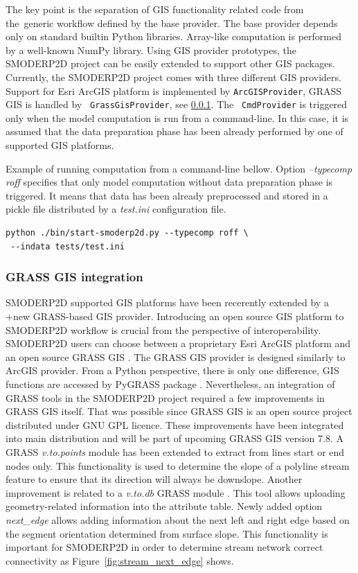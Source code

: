The key point is the separation of GIS functionality related code from
the~generic workflow defined by the base provider. The base provider
depends only on standard builtin Python libraries. Array-like
computation is performed by a well-known NumPy library. Using GIS
provider prototypes, the SMODERP2D project can be easily extended to
support other GIS packages. Currently, the SMODERP2D project comes
with three different GIS providers. Support for Esri ArcGIS platform
is implemented by {\tt ArcGISProvider}, GRASS GIS is handled by {\tt
  GrassGisProvider}, see \ref{sec:grass_provider}. The {\tt
  CmdProvider} is triggered only when the model computation is run
from a command-line. In this case, it is assumed that the data
preparation phase has been already performed by one of supported GIS
platforms.

Example of running computation from a command-line bellow. Option {\it
  --typecomp roff} specifies that only model computation without data
preparation phase is triggered. It means that data has been already
preprocessed and stored in a pickle file distributed by a {\it test.ini}
configuration file.

\begin{verbatim}
python ./bin/start-smoderp2d.py --typecomp roff \
 --indata tests/test.ini
\end{verbatim}

\subsubsection{GRASS GIS integration}\label{sec:grass_provider}
SMODERP2D supported GIS platforms have been recerently extended by a
+new GRASS-based GIS provider. Introducing an open source GIS platform
to SMODERP2D workflow is crucial from the perspective of
interoperability. SMODERP2D users can choose between a proprietary
Esri ArcGIS platform and an open source GRASS GIS
\cite{neteler2012grass}. The GRASS GIS provider is designed similarly
to ArcGIS provider. From a Python perspective, there is only one
difference, GIS functions are accessed by PyGRASS package
\cite{ijgi2010201}. Nevertheless, an integration of GRASS tools in the
SMODERP2D project required a few improvements in GRASS GIS
itself. That was possible since GRASS GIS is an open source project
distributed under GNU GPL licence. These improvements have been
integrated into main distribution and will be part of upcoming GRASS
GIS version 7.8. A GRASS {\em v.to.points} module
\cite{v-to-points-2019} has been extended to extract from lines start
or end nodes only. This functionality is used to determine the slope
of a polyline stream feature to ensure that its direction will always
be downslope. Another
improvement is related to a {\em v.to.db} GRASS module
\cite{v-to-db-2019}. This tool allows uploading geometry-related
information into the attribute table. 
Newly added option {\it
next\_edge} allows adding information about the next left and right
edge based on the segment orientation determined from surface slope. 
This functionality is important for SMODERP2D in order to
determine stream network correct connectivity as
Figure~\ref{fig:stream_next_edge} shows.

